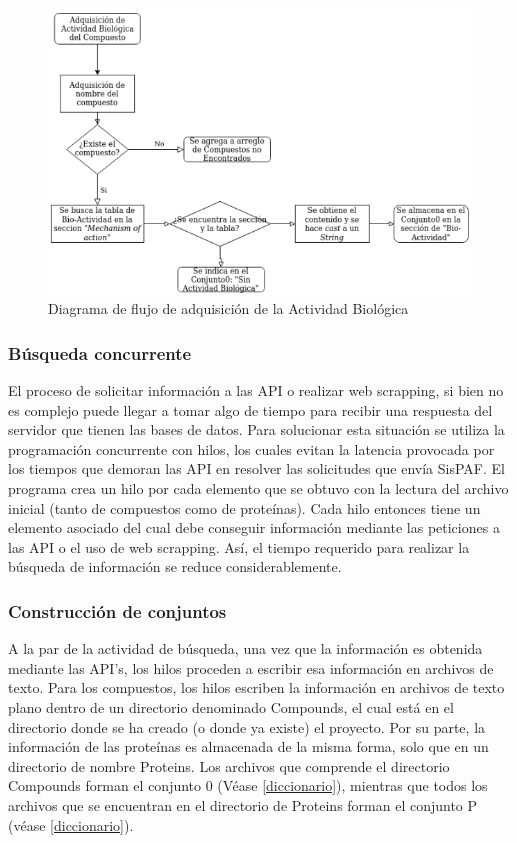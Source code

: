 \begin{figure}[H]
    \centering
    \includegraphics[scale=0.70]{Capitulo4/Documentos/imagenes_entorno/Actividad_biologica.png}
    \caption{Diagrama de flujo de adquisición de la Actividad Biológica}
    \label{Actividad_biologica}
\end{figure}

\subsubsection{Búsqueda concurrente}\label{concurrente}
\noindent El proceso de solicitar información a las API o realizar web scrapping, si bien no es complejo puede llegar a tomar algo de tiempo para recibir una respuesta del servidor que tienen las bases de datos. Para solucionar esta situación se utiliza la programación concurrente con hilos, los cuales evitan la latencia provocada por los tiempos que demoran las API en resolver las solicitudes que envía SisPAF. El programa crea un hilo por cada elemento que se obtuvo con la lectura del archivo inicial (tanto de compuestos como de proteínas). Cada hilo entonces tiene un elemento asociado del cual debe conseguir información mediante las peticiones a las API o el uso de web scrapping. Así, el tiempo requerido para realizar la búsqueda de información se reduce considerablemente.

\subsubsection{Construcción de conjuntos}
\noindent A la par de la actividad de búsqueda, una vez que la información es obtenida mediante las API’s, los hilos proceden a escribir esa información en archivos de texto. Para los compuestos, los hilos escriben la información en archivos de texto plano dentro de un directorio denominado Compounds, el cual está en el directorio donde se ha creado (o donde ya existe) el proyecto. Por su parte, la información de las proteínas es almacenada de la misma forma, solo que en un directorio de nombre Proteins. Los archivos que comprende el directorio Compounds forman el conjunto 0 (Véase \ref{diccionario}), mientras que todos los archivos que se encuentran en el directorio de Proteins forman el conjunto P (véase \ref{diccionario}).

